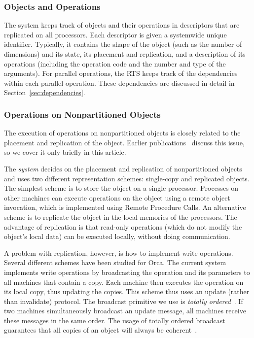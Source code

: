 \documentclass{acmtrans2e}
\begin{document}
\subsubsection{Objects and Operations}

The system keeps track of objects and their operations in descriptors
that are replicated on all processors. Each descriptor is given a
systemwide unique identifier. Typically, it contains the shape of the
object (such as the number of dimensions) and its state, its placement
and replication, and a description of its operations (including the
operation code and the number and type of the arguments). For
parallel operations, the RTS keeps track of the dependencies within
each parallel operation. These dependencies are discussed in detail in
Section~\ref{sec:dependencies}.

\subsubsection{Operations on Nonpartitioned Objects}
\label{sec:replication}

The execution of operations on nonpartitioned objects is closely
related to the placement and replication of the object. Earlier
publications~\cite{bal92,Bal:1998,ics96} discuss this issue, so we cover
it only briefly in this article.

The \emph{system} decides on the placement and replication of
nonpartitioned objects and uses two different representation schemes:
single-copy and replicated objects. The simplest scheme is to store
the object on a single processor.  Processes on other machines can
execute operations on the object using a remote object invocation,
which is implemented using Remote Procedure Calls.  An alternative
scheme is to replicate the object in the local memories of the
processors.  The advantage of replication is that read-only operations
(which do not modify the object's local data) can be executed locally,
without doing communication.

A problem with replication, however, is how to implement write
operations.  Several different schemes have been studied for Orca.
The current system implements write operations by broadcasting the
operation and its parameters to all machines that contain a copy.
Each machine then executes the operation on its local copy, thus
updating the copies. This scheme thus uses an update (rather than
invalidate) protocol.  The broadcast primitive we use is {\em totally
ordered}~\cite{kaashoek93}. If two machines simultaneously broadcast
an update message, all machines receive these messages in the same
order.  The usage of totally ordered broadcast guarantees that all
copies of an object will always be coherent~\cite{bal92}.
\end{document}
